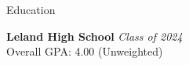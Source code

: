 \documentclass[
	11pt, %
]{resume} %
\begin{document}

\begin{rSection}{Education}
	
	\textbf{Leland High School} \hfill \textit{Class of 2024} \\ 
	Overall GPA: 4.00 (Unweighted)
	
\end{rSection}

\end{document}
